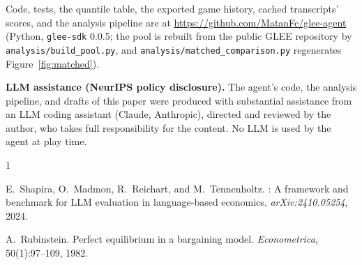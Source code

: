 \documentclass{article}
\begin{document}
Code, tests, the quantile table, the exported game history, cached
transcripts' scores, and the analysis pipeline are at
\url{https://github.com/MatanFc/glee-agent} (Python, \texttt{glee-sdk}
0.0.5; the pool is rebuilt from the public GLEE repository by
\texttt{analysis/build\_pool.py}, and \texttt{analysis/matched\_comparison.py}
regenerates Figure~\ref{fig:matched}).

\textbf{LLM assistance (NeurIPS policy disclosure).} The agent's code, the
analysis pipeline, and drafts of this paper were produced with substantial
assistance from an LLM coding assistant (Claude, Anthropic), directed and
reviewed by the author, who takes full responsibility for the content. No LLM
is used by the agent at play time.

\begin{thebibliography}{1}

E.~Shapira, O.~Madmon, R.~Reichart, and M.~Tennenholtz.
: A framework and benchmark for {LLM} evaluation in
  language-based economics.
\newblock \emph{arXiv:2410.05254}, 2024.

A.~Rubinstein.
\newblock Perfect equilibrium in a bargaining model.
\newblock \emph{Econometrica}, 50(1):97--109, 1982.

\end{thebibliography}
\end{document}
